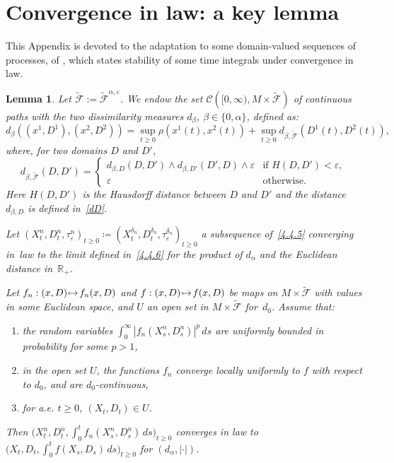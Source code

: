 \documentclass[10pt]{amsart}
\newcommand\mto{\mathchoice{\longmapsto}{\mapsto}{\mapsto}{\mapsto}}
\newenvironment{enumeratei}
{\bgroup\def\theenumi{\roman{enumi}}\def\theenumii{\arabic{enumii}}\begin{enumerate}}
{\end{enumerate}\egroup}
\theoremstyle{plain}
\newtheorem{lemma}[thm]{Lemma}
\theoremstyle{definition}
\newcommand{\RR}{{\mathbb R}}
\newcommand{\SC}{{\mathscr C}}
\newcommand{\SF}{{\mathscr F}}
\newcommand\df{\coloneqq}
\let\di\displaystyle
\let\a\alpha
\let\b\beta
\let\d\delta
\let\e\varepsilon
\begin{document}
\section{Convergence in law: a key lemma}\label{appH}

This Appendix is devoted to the adaptation to some domain-valued sequences of processes, of \cite[Lem.\,4]{Zheng:85}, which states stability of some time integrals under convergence in law.
\begin{lemma}
\label{Zheng}
Let $\tilde\SF:=\tilde \SF^{\a,\e}$. We endow the set $\di \SC\left([0,\infty), M\times \tilde\SF\right)$ of continuous paths with the two dissimilarity measures $d_\b$, $\b\in\{0,\a\}$, defined as:\vspace*{-3pt}
\begin{equation}
d_\b\left((x^1,D^1), (x^2,D^2)\right)=\sup_{t\ge 0}\rho(x^1(t),x^2(t))+\sup_{t\ge 0} d_{\b,\tilde\SF} (D^1(t), D^2(t)),
\end{equation}
where, for two domains $D$ and $D'$,\vspace*{-3pt}
\begin{equation}%
d_{\b,\tilde\SF}(D,D')=
\begin{cases}
d_{\b,D}(D,D') \wedge d_{\b,D'}(D',D)
\wedge\e&\text{if } H(D,D')<\e,\\
\e & \text{otherwise.}
\end{cases}
\end{equation}
Here $H(D,D')$ is the Hausdorff distance between $D$ and $D'$ and the distance $d_{\b,D}$ is defined in~\eqref{dD}.

Let $\di (X_t^n,D_t^n,\tau_\e^n)_{t\ge 0}\!\df\!(X_t^{\d_n},D_t^{\d_n},\tau_\e^{\d_n})_{t\ge 0}$ a subsequence of~\eqref{4.4.5} converging in~law to the limit defined in~\eqref{4.4.6} for the product of $d_\a$ and the Euclidean distance in~$\RR_+$.

Let $f_n:(x,D)\!\mto\! f_n(x,D)$ and $f:(x,D)\!\mto\! f(x,D)$ be maps on $M\times \tilde\SF$ with values in some Euclidean space, and $U$ an open set in $M\times \tilde\SF$ for~$d_0$. Assume that:
\begin{enumeratei}
\item\label{Zhengi} the random variables $\int_0^\infty |f_n(X_s^n,D_s^n)|^p\, ds $ are uniformly bounded in probability for some $p>1$,
\item\label{Zhengii} in the open set $U$, the functions $f_n$ converge locally uniformly to $f$ with respect to $d_0$, and are $d_0$-continuous,
\item\label{Zhengiii} for a.e. $t\geq 0$, $(X_t,D_t)\in U$.
\end{enumeratei}
\noindent
Then $\bigl(X_t^n, D_t^n,\int_0^t f_n(X_s^n, D_s^n)\, ds\bigr)_{t\ge 0}$ converges in law to $\bigl(X_t, D_t,\int_0^t f(X_s, D_s)\, ds\bigr)_{t\ge 0}$ for $(d_\a,|\cdot|)$.
\end{lemma}
\end{document}
